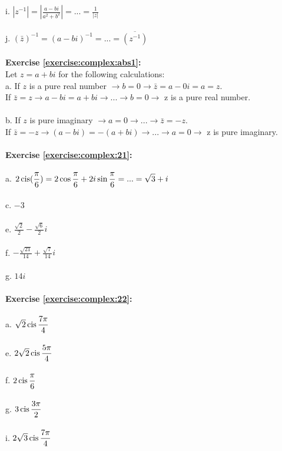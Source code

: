 i. $\left|z^{-1}\right|=\left|\displaystyle\frac{a-bi}{a^{2}+b^{2}}\right|=...=\displaystyle\frac{1}{\left|z\right|}$\\
\\
j. $(\bar{z})^{-1}=(a-bi)^{-1}=...=\overline{(z^{-1})}$\\
\\
\textbf{Exercise \ref{exercise:complex:abs1}:}\\
Let $z=a+bi$ for the following calculations:\\
a. If $z$ is a pure real number $\rightarrow b=0 \rightarrow \bar{z}=a-0i=a=z$.\\
If $\bar{z}=z \rightarrow a-bi=a+bi \rightarrow ... \rightarrow b=0 \rightarrow $ z is a pure real number.\\
\\
b. If $z$ is pure imaginary $\rightarrow a=0 \rightarrow ... \rightarrow \bar{z}=-z$.\\
If $\bar{z}=-z \rightarrow (a-bi)=-(a+bi) \rightarrow ... \rightarrow a=0 \rightarrow $ z is pure imaginary.\\
\\
\textbf{Exercise \ref{exercise:complex:21}:}\\
\\
a. $2\operatorname{cis}(\displaystyle\frac{\pi}{6})=2\cos\frac{\pi}{6}+2i\sin\frac{\pi}{6}=...=\sqrt{3}+i$\\
\\
c. $-3$\\
\\
e. $\displaystyle\frac{\sqrt{2}}{2}-\frac{\sqrt{6}}{2}i$\\
\\
f. $-\displaystyle\frac{\sqrt{21}}{14}+\frac{\sqrt{7}}{14}i$\\
\\
g. $14i$\\
\\
\textbf{Exercise \ref{exercise:complex:22}:}\\
\\
a. $\sqrt{2}\operatorname{cis}\displaystyle\frac{7\pi}{4}$\\
\\
e. $2\sqrt{2}\operatorname{cis}\displaystyle\frac{5\pi}{4}$\\
\\
f. $2\operatorname{cis}\displaystyle\frac{\pi}{6}$\\
\\
g. $3\operatorname{cis}\displaystyle\frac{3\pi}{2}$\\
\\
i. $2\sqrt{3}\operatorname{cis}\displaystyle\frac{7\pi}{4}$\\
